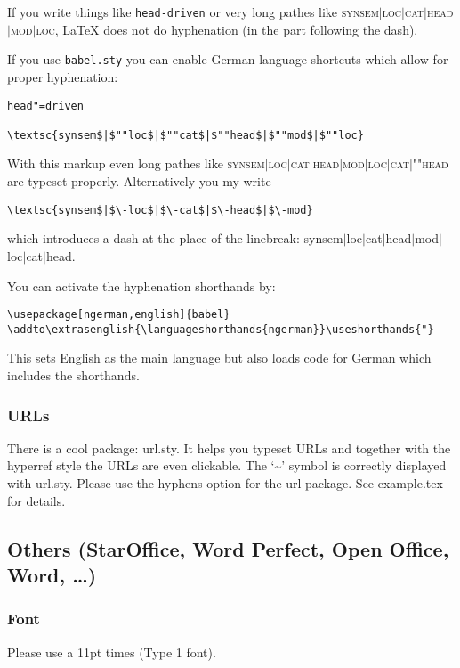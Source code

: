 \documentclass[11pt,a4paper,fleqn]{article}
\begin{document}
If you write things like \verb+head-driven+ or very long pathes like
\textsc{synsem$|$loc$|$cat$|$head$|$mod$|$loc}, \LaTeX{} does not do hyphenation
(in the part following the dash).

If you use \verb+babel.sty+ you can enable German language shortcuts which allow for proper hyphenation:
\begin{verbatim}
head"=driven

\textsc{synsem$|$""loc$|$""cat$|$""head$|$""mod$|$""loc}
\end{verbatim}
With this markup even long pathes like \textsc{synsem$|$loc$|$cat$|$head$|$mod$|$loc$|$cat$|$""head}
are typeset properly. Alternatively you my write
\begin{verbatim}
\textsc{synsem$|$\-loc$|$\-cat$|$\-head$|$\-mod}
\end{verbatim}
which introduces a dash at the place of the linebreak:
{\sc synsem$|$\-loc$|$\-cat$|$\-head$|$\-mod$|$\-loc$|$\-cat$|$\-head}.

You can activate the hyphenation shorthands by:
\begin{verbatim}
\usepackage[ngerman,english]{babel}
\addto\extrasenglish{\languageshorthands{ngerman}}\useshorthands{"}
\end{verbatim}
This sets English as the main language but also loads code for German which includes the shorthands.

\subsubsection{URLs}

There is a cool package: url.sty. It helps you typeset URLs and together with the hyperref style the
URLs are even clickable. The `\~{}' symbol is correctly displayed with url.sty. Please use the
hyphens option for the url package. See example.tex for details.





\subsection{Others (StarOffice, Word Perfect, Open Office, Word, \ldots)}

\subsubsection{Font}

Please use a 11pt times (Type 1 font). 
\end{document}
